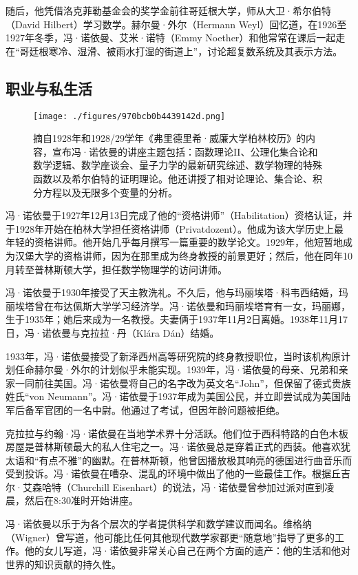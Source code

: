 随后，他凭借洛克菲勒基金会的奖学金前往哥廷根大学，师从大卫·希尔伯特（David Hilbert）学习数学。赫尔曼·外尔（Hermann Weyl）回忆道，在1926至1927年冬季，冯·诺依曼、艾米·诺特（Emmy Noether）和他常常在课后一起走在“哥廷根寒冷、湿滑、被雨水打湿的街道上”，讨论超复数系统及其表示方法。
\subsection{职业与私生活}
\begin{figure}[ht]
\centering
\texttt{[image: ./figures/970bcb0b4439142d.png]}
\caption{摘自1928年和1928/29学年《弗里德里希·威廉大学柏林校历》的内容，宣布冯·诺依曼的讲座主题包括：函数理论II、公理化集合论和数学逻辑、数学座谈会、量子力学的最新研究综述、数学物理的特殊函数以及希尔伯特的证明理论。他还讲授了相对论理论、集合论、积分方程以及无限多个变量的分析。} \label{fig_Neuman_2}
\end{figure}
冯·诺依曼于1927年12月13日完成了他的“资格讲师”（Habilitation）资格认证，并于1928年开始在柏林大学担任资格讲师（Privatdozent）。他成为该大学历史上最年轻的资格讲师。他开始几乎每月撰写一篇重要的数学论文。1929年，他短暂地成为汉堡大学的资格讲师，因为在那里成为终身教授的前景更好；然后，他在同年10月转至普林斯顿大学，担任数学物理学的访问讲师。

冯·诺依曼于1930年接受了天主教洗礼。不久后，他与玛丽埃塔·科韦西结婚，玛丽埃塔曾在布达佩斯大学学习经济学。冯·诺依曼和玛丽埃塔育有一女，玛丽娜，生于1935年；她后来成为一名教授。夫妻俩于1937年11月2日离婚。1938年11月17日，冯·诺依曼与克拉拉·丹（Klára Dán）结婚。

1933年，冯·诺依曼接受了新泽西州高等研究院的终身教授职位，当时该机构原计划任命赫尔曼·外尔的计划似乎未能实现。1939年，冯·诺依曼的母亲、兄弟和亲家一同前往美国。冯·诺依曼将自己的名字改为英文名“John”，但保留了德式贵族姓氏“von Neumann”。冯·诺依曼于1937年成为美国公民，并立即尝试成为美国陆军后备军官团的一名中尉。他通过了考试，但因年龄问题被拒绝。

克拉拉与约翰·冯·诺依曼在当地学术界十分活跃。他们位于西科特路的白色木板房屋是普林斯顿最大的私人住宅之一。冯·诺依曼总是穿着正式的西装。他喜欢犹太语和“有点不雅”的幽默。在普林斯顿，他曾因播放极其响亮的德国进行曲音乐而受到投诉。冯·诺依曼在嘈杂、混乱的环境中做出了他的一些最佳工作。根据丘吉尔·艾森哈特（Churchill Eisenhart）的说法，冯·诺依曼曾参加过派对直到凌晨，然后在8:30准时开始讲座。

冯·诺依曼以乐于为各个层次的学者提供科学和数学建议而闻名。维格纳（Wigner）曾写道，他可能比任何其他现代数学家都更“随意地”指导了更多的工作。他的女儿写道，冯·诺依曼非常关心自己在两个方面的遗产：他的生活和他对世界的知识贡献的持久性。


